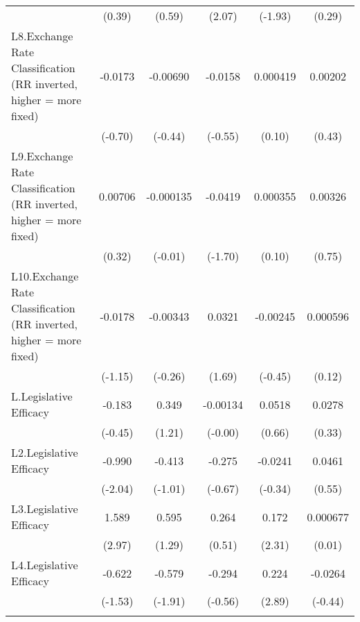 {\begin{longtable}{l*{5}{c}}
                &   (0.39)         &   (0.59)         &   (2.07)         &  (-1.93)         &   (0.29)         \\
\addlinespace
L8.Exchange Rate Classification (RR inverted, higher = more fixed)&  -0.0173         & -0.00690         &  -0.0158         & 0.000419         &  0.00202         \\
                &  (-0.70)         &  (-0.44)         &  (-0.55)         &   (0.10)         &   (0.43)         \\
\addlinespace
L9.Exchange Rate Classification (RR inverted, higher = more fixed)&  0.00706         &-0.000135         &  -0.0419         & 0.000355         &  0.00326         \\
                &   (0.32)         &  (-0.01)         &  (-1.70)         &   (0.10)         &   (0.75)         \\
\addlinespace
L10.Exchange Rate Classification (RR inverted, higher = more fixed)&  -0.0178         & -0.00343         &   0.0321         & -0.00245         & 0.000596         \\
                &  (-1.15)         &  (-0.26)         &   (1.69)         &  (-0.45)         &   (0.12)         \\
\addlinespace
L.Legislative Efficacy&   -0.183         &    0.349         & -0.00134         &   0.0518         &   0.0278         \\
                &  (-0.45)         &   (1.21)         &  (-0.00)         &   (0.66)         &   (0.33)         \\
\addlinespace
L2.Legislative Efficacy&   -0.990\sym{*}  &   -0.413         &   -0.275         &  -0.0241         &   0.0461         \\
                &  (-2.04)         &  (-1.01)         &  (-0.67)         &  (-0.34)         &   (0.55)         \\
\addlinespace
L3.Legislative Efficacy&    1.589\sym{**} &    0.595         &    0.264         &    0.172\sym{*}  & 0.000677         \\
                &   (2.97)         &   (1.29)         &   (0.51)         &   (2.31)         &   (0.01)         \\
\addlinespace
L4.Legislative Efficacy&   -0.622         &   -0.579         &   -0.294         &    0.224\sym{**} &  -0.0264         \\
                &  (-1.53)         &  (-1.91)         &  (-0.56)         &   (2.89)         &  (-0.44)         \\
\addlinespace

\end{longtable}}
